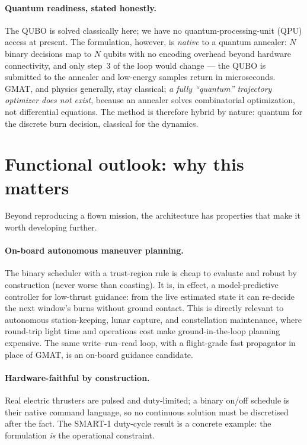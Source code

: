 \documentclass[11pt,a4paper]{article}
\theoremstyle{plain}
\begin{document}
\paragraph{Quantum readiness, stated honestly.} The QUBO is solved classically
here; we have no quantum-processing-unit (QPU) access at present. The
formulation, however, is \emph{native} to a quantum annealer: $N$ binary
decisions map to $N$ qubits with no encoding overhead beyond hardware
connectivity, and only step~3 of the loop would change --- the QUBO is
submitted to the annealer and low-energy samples return in microseconds.
GMAT, and physics generally, stay classical; \emph{a fully ``quantum''
trajectory optimizer does not exist}, because an annealer solves combinatorial
optimization, not differential equations. The method is therefore hybrid by
nature: quantum for the discrete burn decision, classical for the dynamics.

\section{Functional outlook: why this matters}\label{sec:outlook}
Beyond reproducing a flown mission, the architecture has properties that make
it worth developing further.

\paragraph{On-board autonomous maneuver planning.} The binary scheduler with a
trust-region rule is cheap to evaluate and robust by construction (never worse
than coasting). It is, in effect, a model-predictive controller for low-thrust
guidance: from the live estimated state it can re-decide the next window's
burns without ground contact. This is directly relevant to autonomous
station-keeping, lunar capture, and constellation maintenance, where
round-trip light time and operations cost make ground-in-the-loop planning
expensive. The same write--run--read loop, with a flight-grade fast propagator
in place of GMAT, is an on-board guidance candidate.

\paragraph{Hardware-faithful by construction.} Real electric thrusters are
pulsed and duty-limited; a binary on/off schedule is their native command
language, so no continuous solution must be discretised after the fact. The
SMART-1 duty-cycle result is a concrete example: the formulation \emph{is} the
operational constraint.
\end{document}
